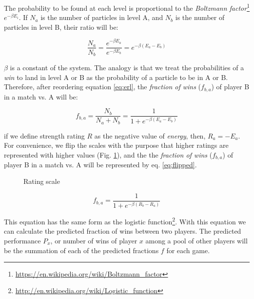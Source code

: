 \documentclass[12pt]{article}
\begin{document}
The probability to be found at each level is proportional to the 
\textit{Boltzmann factor}\footnote{\url{https://en.wikipedia.org/wiki/Boltzmann_factor}} $e^{-\beta E_{i}}$.
If $N_{a}$ is the number of particles in level A, and $N_{b}$ is the number of particles in level B, their ratio will be:

	\begin{equation} \label{eq:erl}
	\frac{N_{a}}{N_{b}} = \frac{ e^{-\beta E_{a}} }{ e^{-\beta E_{b}} } = e^{-\beta(E_{a}-E_{b})}
	\end{equation}

$\beta$ is a constant of the system.
The analogy is that we treat the probabilities of a \textit{win} to land in level A or B as the probability of a particle to be in A or B.
Therefore, after reordering equation \ref{eq:erl}, the \textit{fraction of wins} ($f_{b,a}$) of player B in a match vs. A will be:

	\begin{equation}
	f_{b,a}  = \frac{ N_{b} }{ N_{a}+N_{b} }  =     \frac{1}{1 + e^{-\beta(E_{a}-E_{b})}}  
	\end{equation}

if we define strength rating $R$ as the negative value of \textit{energy}, then, $R_{a} = -E_{a}$.
For convenience, we flip the scales with the purpose that higher ratings are represented with higher values (Fig. \ref{fig:figlevels2}), and the the \textit{fraction of wins} ($f_{b,a}$) of player B in a match vs. A will be represented by eq. \ref{eq:flipped}.

	\begin{figure}[htb]
	\caption{\label{fig:figlevels2} Rating scale}
	\end{figure}


	\begin{equation} \label{eq:flipped}
	f_{b,a}  = \frac{1}{1 + e^{-\beta(R_{b}-R_{a})}}
	\end{equation}

This equation has the same form as the logistic function\footnote{\url{http://en.wikipedia.org/wiki/Logistic_function}}.
With this equation we can calculate the predicted fraction of wins between two players. 
The predicted performance $P_{x}$, or number of wins of player $x$ among a pool of other players will be the summation of each of the predicted fractions $f$ for each game.
\end{document}
